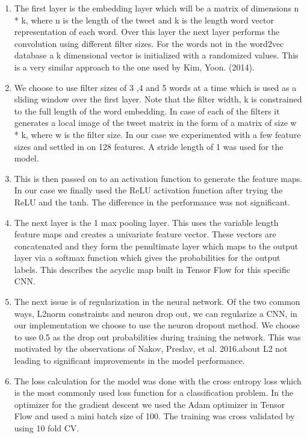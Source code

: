 \documentclass[conference]{IEEEtran}
\begin{document}
\begin{enumerate}
\item 
The first layer is the embedding layer which will be a matrix of dimensions n * k, where n is the length of the tweet and k is the length word vector representation of each word. Over this layer the next layer performs the convolution using different filter sizes. For the words not in the word2vec database a  k dimensional vector is initialized with a randomized values. This is a very similar approach to the one used by Kim, Yoon. (2014). 
\item 
We choose to use filter sizes of 3 ,4 and 5 words at a time which is used as a sliding window over the first layer. Note that the filter width, k is constrained to the full length of the word embedding. In case of each of the filters it generates a local image of the tweet matrix in the form of a matrix of size w * k, where w is the filter size. In our case we experimented with a few feature sizes and settled in on 128 features. A stride length of 1 was used for the model. 
\item 
This is then passed on to an activation function to generate the feature maps. In our case we finally used the ReLU activation function after trying the ReLU and the tanh. The difference in the performance was not significant. 
\item
The next layer is the 1 max pooling layer. This uses the variable length feature maps and creates a univariate feature vector. These vectors are concatenated and they form the penultimate layer which maps to the output layer via a softmax function which gives the probabilities for the output labels. This describes the acyclic map built in Tensor Flow for this specific CNN.
\item
The next issue is of regularization in the neural network. Of the two common ways, L2norm constraints and neuron drop out, we can regularize a CNN, in our implementation we choose to use the neuron dropout method. We choose to use 0.5 as the drop out probabilities during training the network. This was motivated by the observations of Nakov, Preslav, et al. 2016.about L2 not leading to significant improvements in the model performance.
\item
The loss calculation for the model was done with the cross entropy loss which is the most commonly used loss function for a classification problem. In the optimizer for the gradient descent we used the Adam optimizer in Tensor Flow and used a mini batch size of 100. The training was cross validated by using 10 fold CV.
\end{enumerate}
\end{document}
